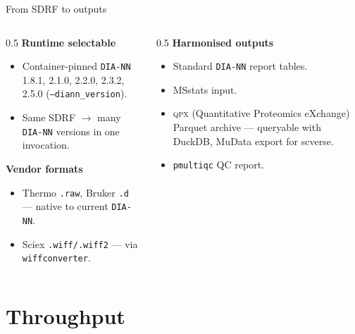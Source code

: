 \documentclass[aspectratio=169,11pt]{beamer}
\newcommand{\diann}{\texttt{DIA-NN}}
\begin{document}
\begin{frame}{From SDRF to outputs}
  \begin{columns}[T]
    \begin{column}{0.5\textwidth}
      \textbf{Runtime selectable}
      \begin{itemize}\small
        \item Container-pinned \diann{} 1.8.1, 2.1.0, 2.2.0, 2.3.2, 2.5.0
              (\texttt{--diann\_version}).
        \item Same SDRF $\rightarrow$ many \diann{} versions in one invocation.
      \end{itemize}
      \vspace{0.4em}
      \textbf{Vendor formats}
      \begin{itemize}\small
        \item Thermo \texttt{.raw}, Bruker \texttt{.d} --- native to current \diann{}.
        \item Sciex \texttt{.wiff/.wiff2} --- via \texttt{wiffconverter}.
      \end{itemize}
    \end{column}
    \begin{column}{0.5\textwidth}
      \textbf{Harmonised outputs}
      \begin{itemize}\small
        \item Standard \diann{} report tables.
        \item MSstats input.
        \item \textcolor{qmblue}{\textsc{qpx}} (Quantitative Proteomics
              eXchange) Parquet archive --- queryable with DuckDB, MuData
              export for scverse.
        \item \texttt{pmultiqc} QC report.
      \end{itemize}
    \end{column}
  \end{columns}
\end{frame}

\section{Throughput}
\end{document}

